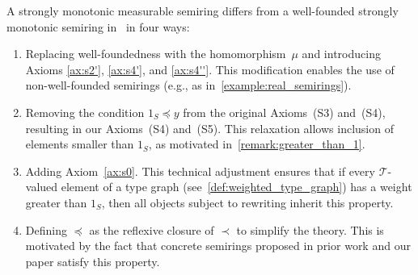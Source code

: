 \begin{remark}
    \label{remark:diff_measurable_semiring}
A strongly monotonic measurable semiring differs from a well-founded strongly monotonic semiring in~\cite{endrullis2024generalized} in four ways:
\begin{enumerate}[label=(\arabic*),noitemsep]
    \item Replacing well-foundedness with the homomorphism~$\mu$ and introducing Axioms \eqref{ax:s2'}, \eqref{ax:s4'}, and \eqref{ax:s4''}. This modification enables the use of non-well-founded semirings (e.g., as in~\autoref{example:real_semirings}).
    \item Removing the condition $1_S \preceq y$ from the original Axioms~(S3) and~(S4), resulting in our Axioms~(S4) and~(S5). This relaxation allows inclusion of elements smaller than $1_S$, as motivated in~\autoref{remark:greater_than_1}.
    \item Adding Axiom~\eqref{ax:s0}. This technical adjustment ensures that if every $\mathcal{T}$-valued element of a type graph (see~\autoref{def:weighted_type_graph}) has a weight greater than $1_S$, then all objects subject to rewriting inherit this property.
    \item Defining $\preceq$ as the reflexive closure of $\prec$ to simplify the theory. This is motivated by the fact that concrete semirings proposed in prior work and our paper satisfy this property.
\end{enumerate} 
\end{remark}